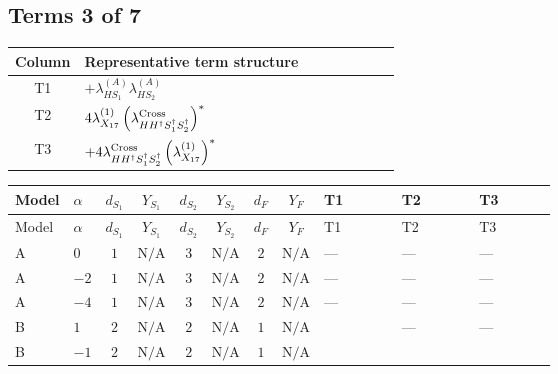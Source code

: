 \documentclass[8pt]{article}
\begin{document}
\begin{landscape}
\subsection*{Terms 3 of 7}
\begin{center}
\begin{tabular}{@{}c >{\raggedright\arraybackslash}p{0.82\linewidth}@{}}
\toprule
Column & Representative term structure \\
\midrule
T1 & \(\displaystyle +{\lambda_{HS_1}^{(A)}} {\lambda_{HS_2}^{(A)}}\) \\
\midrule
T2 & \(\displaystyle 4 {\lambda_{X_{17}}^{(1)}} \left({\lambda_{H H^\dagger S_1^\dagger S_2^\dagger}^{\rm Cross}}\right)^{*}\) \\
\midrule
T3 & \(\displaystyle +4 {\lambda_{H H^\dagger S_1^\dagger S_2^\dagger}^{\rm Cross}} \left({\lambda_{X_{17}}^{(1)}}\right)^{*}\) \\
\midrule
\bottomrule
\end{tabular}
\end{center}
\smallskip
\tiny
\begin{longtable}{@{}llcccccc >{\raggedright\arraybackslash}p{0.21\linewidth} >{\raggedright\arraybackslash}p{0.21\linewidth} >{\raggedright\arraybackslash}p{0.21\linewidth}@{}}
\toprule
Model & $\alpha$ & $d_{S_1}$ & $Y_{S_1}$ & $d_{S_2}$ & $Y_{S_2}$ & $d_F$ & $Y_F$ & T1 & T2 & T3 \\
\midrule
\endfirsthead
\toprule
Model & $\alpha$ & $d_{S_1}$ & $Y_{S_1}$ & $d_{S_2}$ & $Y_{S_2}$ & $d_F$ & $Y_F$ & T1 & T2 & T3 \\
\midrule
\endhead
A & $0$ & $1$ & $\text{N/A}$ & $3$ & $\text{N/A}$ & $2$ & $\text{N/A}$ & --- & --- & --- \\
\midrule
A & $-2$ & $1$ & $\text{N/A}$ & $3$ & $\text{N/A}$ & $2$ & $\text{N/A}$ & --- & --- & --- \\
\midrule
A & $-4$ & $1$ & $\text{N/A}$ & $3$ & $\text{N/A}$ & $2$ & $\text{N/A}$ & --- & --- & --- \\
\midrule
B & $1$ & $2$ & $\text{N/A}$ & $2$ & $\text{N/A}$ & $1$ & $\text{N/A}$ & \scriptsize\adjustbox{max width=\linewidth}{$\begin{gathered} +{\lambda_{HS_1}^{(A)}} {\lambda_{HS_2}^{(A)}}\end{gathered}$} & --- & --- \\
\midrule
B & $-1$ & $2$ & $\text{N/A}$ & $2$ & $\text{N/A}$ & $1$ & $\text{N/A}$ & \scriptsize\adjustbox{max width=\linewidth}{$\begin{gathered} +{\lambda_{HS_1}^{(A)}} {\lambda_{HS_2}^{(A)}}\end{gathered}$} & \scriptsize\adjustbox{max width=\linewidth}{$\begin{gathered} 4 {\lambda_{X_{17}}^{(1)}} \left({\lambda_{H H^\dagger S_1^\dagger S_2^\dagger}^{\rm Cross}}\right)^{*}\end{gathered}$} & \scriptsize\adjustbox{max width=\linewidth}{$\begin{gathered} +4 {\lambda_{H H^\dagger S_1^\dagger S_2^\dagger}^{\rm Cross}} \left({\lambda_{X_{17}}^{(1)}}\right)^{*}\end{gathered}$} \\

\end{longtable}
\end{landscape}
\end{document}
